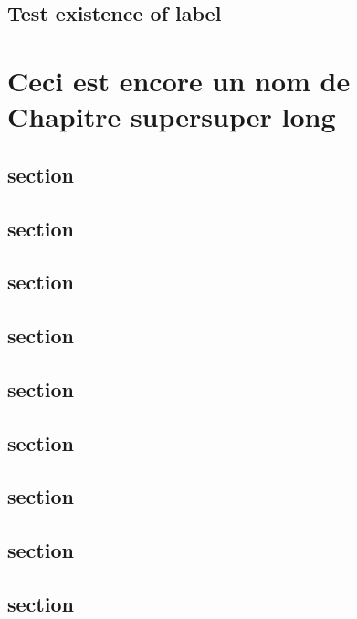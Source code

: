 \documentclass[11pt,table]{book}
\begin{document}
\lipsum[1]

\section{Test existence of label}

\def\difficulty{2}
\chapter[2e chapitre long]{Ceci est encore un nom de Chapitre su\-per\-su\-per long}


\section{section}
\section{section}
\section{section}
\section{section}
\section{section}
\section{section}
\section{section}
\section{section}
\section{section}
\end{document}
